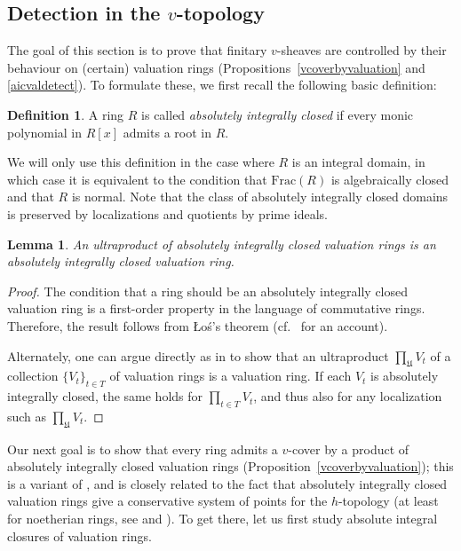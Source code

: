 \documentclass[reqno]{amsart}
\let\strokeL\L
\newtheorem{lemma}[theorem]{Lemma}
\theoremstyle{definition}
\newtheorem{definition}[theorem]{Definition}
\begin{document}
\subsection{Detection in the $v$-topology}
\label{vSheafAICVR}

The goal of this section is to prove that finitary $v$-sheaves are controlled by their behaviour on (certain) valuation rings (Propositions~\ref{vcoverbyvaluation} and \ref{aicvaldetect}). To formulate these, we first recall the following basic definition:

\begin{definition} 
\label{aic}
A ring $R$ is called \emph{absolutely integrally closed} if every monic polynomial in $R[x]$ admits a root in $R$. 
\end{definition} 


We will only use this definition in the case where $R$ is an integral domain, in
which case it is equivalent to the condition that $\mathrm{Frac}(R)$ is
algebraically closed and that $R$ is normal. Note that the class of absolutely
integrally closed domains is preserved 
by localizations and quotients by prime ideals. 

\begin{lemma} 
\label{ultraaic}
An ultraproduct of absolutely integrally closed valuation rings is an absolutely integrally closed valuation ring. 
\end{lemma} 
\begin{proof} 
The condition that a ring should be an absolutely integrally closed valuation ring is a first-order
property in the language of commutative rings. Therefore, the result follows
from \strokeL o\'s's  theorem (cf.~\cite[Th.~4.1.9]{CKmodel} for an account).  

Alternately, one can argue directly as in \cite[Lemma 6.2]{BhattScholzeWitt} to show that an ultraproduct $\prod_{\mathfrak{U}} V_t$ of a collection $\{V_t\}_{t \in T}$ of valuation rings is a valuation ring. If each $V_t$ is absolutely integrally closed, the same holds for $\prod_{t \in T} V_t$, and thus also for any localization such as $\prod_{\mathfrak{U}} V_t$.
\end{proof} 



Our next goal is to show that every ring admits a $v$-cover by a product of
absolutely integrally closed valuation rings
(Proposition~\ref{vcoverbyvaluation}); this is a variant of \cite[Lemma
6.2]{BhattScholzeWitt}, and is closely related to the fact that absolutely
integrally closed valuation rings give a conservative system of points for the
$h$-topology (at least for noetherian rings, see \cite[Prop.~2.2, Cor.~3.8]{GooLi} and \cite{GabberKelly}).  To get there, let us first study absolute integral closures of valuation rings. 
\end{document}

